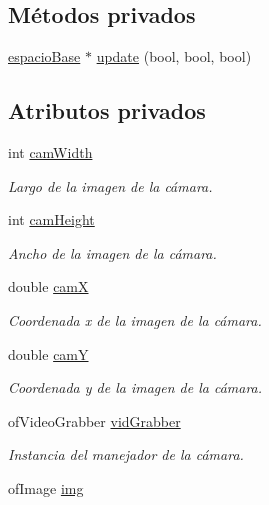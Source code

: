 \subsection*{Métodos privados}
\begin{DoxyCompactItemize}
\item 
\hyperlink{classespacio_base}{espacio\+Base} $\ast$ \hyperlink{classespacio_camara_a5c83fc15be5b2a97469b9f103fd07b72}{update} (bool, bool, bool)
\end{DoxyCompactItemize}
\subsection*{Atributos privados}
\begin{DoxyCompactItemize}
\item 
int \hyperlink{classespacio_camara_aa357745006c6358ac4919ea079e80caa}{cam\+Width}
\begin{DoxyCompactList}\small\item\em Largo de la imagen de la cámara. \end{DoxyCompactList}\item 
int \hyperlink{classespacio_camara_ac9c3980d5710ce9ae83a95a4e7d4bf3a}{cam\+Height}
\begin{DoxyCompactList}\small\item\em Ancho de la imagen de la cámara. \end{DoxyCompactList}\item 
double \hyperlink{classespacio_camara_ac94dd88aad08d2077050c79e490d0a37}{cam\+X}
\begin{DoxyCompactList}\small\item\em Coordenada x de la imagen de la cámara. \end{DoxyCompactList}\item 
double \hyperlink{classespacio_camara_a0dec829b25bb09c1f70150f885d9843e}{cam\+Y}
\begin{DoxyCompactList}\small\item\em Coordenada y de la imagen de la cámara. \end{DoxyCompactList}\item 
of\+Video\+Grabber \hyperlink{classespacio_camara_a005166cb15e10461341d0e28b145134f}{vid\+Grabber}
\begin{DoxyCompactList}\small\item\em Instancia del manejador de la cámara. \end{DoxyCompactList}\item 
of\+Image \hyperlink{classespacio_camara_a71d14cf73376b62e3158e90a6f72d18f}{img}

\end{DoxyCompactItemize}
